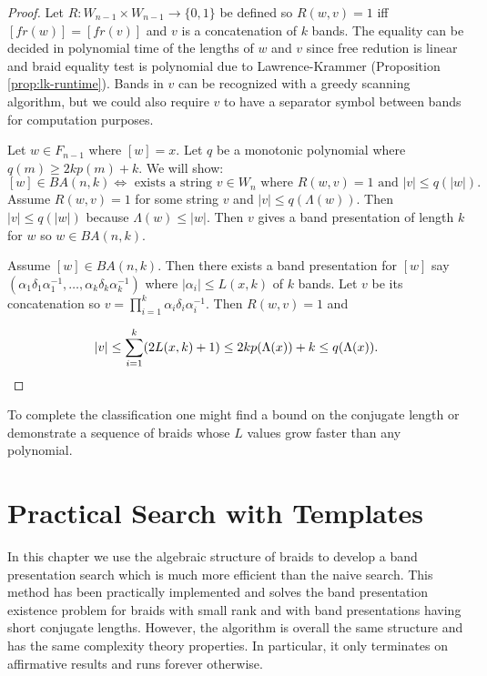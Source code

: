 \documentclass[12pt]{thesis}
\begin{document}
\begin{proof}
    Let $R \colon W_{n-1} \times W_{n-1} \rightarrow \{ 0, 1\}$ be defined
    so  $R(w, v) = 1$ iff $[fr(w)] = [fr(v)]$ and $v$ is a concatenation of $k$ bands.
    The equality can be decided in polynomial time of the lengths of $w$ and $v$
    since free redution is linear and
    braid equality test is polynomial due to Lawrence-Krammer (Proposition \ref{prop:lk-runtime}).
    Bands in $v$ can be recognized
    with a greedy scanning algorithm, but we could also require $v$ to 
    have a separator symbol between bands for computation purposes.

    Let $w \in F_{n-1}$ where $[w] = x$.
    Let $q$ be a monotonic polynomial where $q(m) \geq 2kp(m) + k$.
    We will show:
    \[
        [w] \in BA(n, k) \Leftrightarrow \text{ exists a string $v \in W_{n}$ where $R(w, v) = 1$ and $|v| \leq q(|w|)$}.
    \]
    Assume $R(w, v) = 1$ for some string $v$ and $|v| \leq q(\Lambda(w))$.
    Then $|v| \leq q(|w|)$ because $\Lambda(w) \leq |w|$.
    Then $v$ gives a band presentation of length $k$ for $w$ so $w \in BA(n, k)$. 

    \begin{sloppypar}
    Assume $[w] \in BA(n, k)$.
    Then there exists a band presentation for $[w]$
    say
     $(\alpha_{1} \delta_{1} \alpha_{1}^{-1},
    \ldots, \alpha_{k} \delta_{k} \alpha_{k}^{-1})$
    where $|\alpha_{i}| \leq L(x, k)$ of $k$ bands.
    Let $v$ be its concatenation so $v = \prod_{i=1}^{k} \alpha_{i}\delta_{i}\alpha_{i}^{-1}$.
    Then $R(w, v) = 1$ and
    \end{sloppypar}
    \[
        |v| \leq \sum_{i=1}^{k} (2L(x, k) + 1) \leq  2kp(\Lambda(x)) + k \leq q(\Lambda(x)). \qedhere 
    \] 
\end{proof}

To complete the classification one might find a bound on the conjugate length
or demonstrate a sequence of braids
whose $L$ values grow faster than any polynomial.

\chapter{Practical Search with Templates}

In this chapter we use the algebraic structure of braids to develop a band presentation search which is much more
efficient than the naive search.
This method has been practically implemented and
solves the band presentation existence problem for braids with small rank and with band presentations having short
conjugate lengths.
However, the algorithm is overall the same structure and has the same complexity theory properties.
In particular, it only terminates on affirmative results
and runs forever otherwise. 
\end{document}
